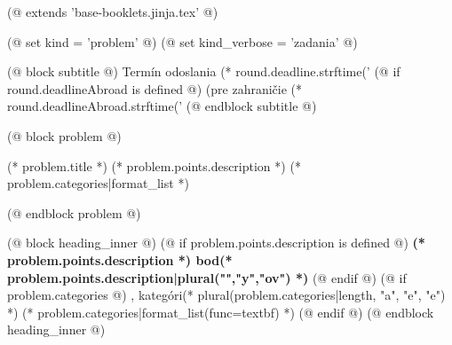 (@ extends 'base-booklets.jinja.tex' @)

(@ set kind = 'problem' @)
(@ set kind_verbose = 'zadania' @)

(@ block subtitle @)
    {
        \centering
        \vspace*{-1.5em}
        Termín odoslania (* round.deadline.strftime('%
        (@ if round.deadlineAbroad is defined @) (pre zahraničie (* round.deadlineAbroad.strftime('%
    }
(@ endblock subtitle @)

(@ block problem @)
    \begin{seminar-problem}%
        {(* problem.title *)}%
        {(* problem.points.description *)}%
        {(* problem.categories|format_list *)}
    \end{seminar-problem}
(@ endblock problem @)

(@ block heading_inner @)
    (@ if problem.points.description is defined @)%
        \textbf{(* problem.points.description *) bod(* problem.points.description|plural("","y","ov") *)}%
    (@ endif @)%
    (@ if problem.categories @)%
        , kategóri(* plural(problem.categories|length, "a", "e", "e") *) (* problem.categories|format_list(func=textbf) *)%
    (@ endif @)%
(@ endblock heading_inner @)
